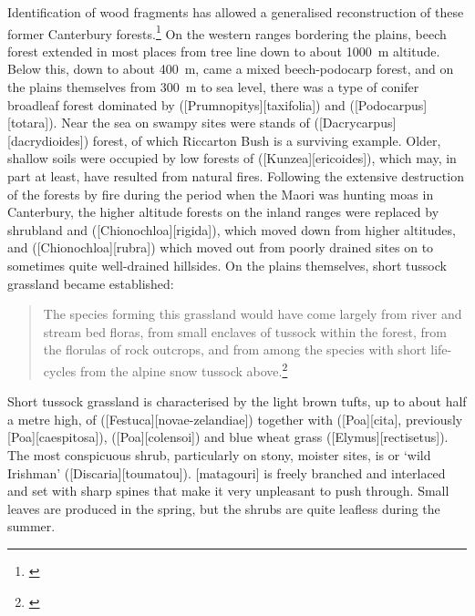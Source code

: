Identification of wood fragments has allowed a generalised reconstruction of these former Canterbury forests.\footnote{\cite{molloy1969recent}}
On the western ranges bordering the plains, beech forest extended in most places from tree line down to about \SI{1000}{\metre} altitude.
Below this, down to about \SI{400}{\metre}, came a mixed beech-podocarp forest, and on the plains themselves from \SI{300}{\metre} to sea level, there was a type of conifer broadleaf forest dominated by  ([Prumnopitys][taxifolia]) and  ([Podocarpus][totara]).
Near the sea on swampy sites were stands of  ([Dacrycarpus][dacrydioides]) forest, of which Riccarton Bush is a surviving example.
Older, shallow soils were occupied by low forests of  ([Kunzea][ericoides]), which may, in part at least, have resulted from natural fires.
Following the extensive destruction of the forests by fire during the period when the Maori was hunting moas in Canterbury, the higher altitude forests on the inland ranges were replaced by shrubland and  ([Chionochloa][rigida]), which moved down from higher altitudes, and  ([Chionochloa][rubra]) which moved out from poorly drained sites on to sometimes quite well-drained hillsides.
On the plains themselves, short tussock grassland became established:

\begin{quote}
	The species forming this grassland would have come largely from river and stream bed floras, from small enclaves of tussock within the forest, from the florulas of rock outcrops, and from among the species with short life-cycles from the alpine snow tussock above.\footnote{\cite{connor1969montane}}
\end{quote}

Short tussock grassland is characterised by the light brown tufts, up to about half a metre high, of  ([Festuca][novae-zelandiae]) together with  ([Poa][cita], previously [Poa][caespitosa]),  ([Poa][colensoi]) and blue wheat grass ([Elymus][rectisetus]).
The most conspicuous shrub, particularly on stony, moister sites, is  or `wild Irishman' ([Discaria][toumatou]).
[matagouri] is freely branched and interlaced and set with sharp spines that make it very unpleasant to push through.
Small leaves are produced in the spring, but the shrubs are quite leafless during the summer.

